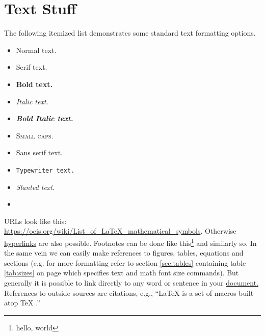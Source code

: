 \section{Text Stuff}
The following  itemized   list
demonstrates
    some standard 
%
text
%
%
    formatting options.

\begin{multicols}{2}
\begin{itemize}[itemsep=0mm]
	\item[\checkmark] Normal text.
	\item \textrm{Serif text.}
	\item \textbf{Bold text.} %
	\item \textit{Italic text.} %
	\item \textbf{\textit{Bold Italic text.}}
	\item \textsc{Small caps.}
	\item \textsf{Sans serif text.} %
	\item \texttt{Typewriter text.} %
	\item \textsl{Slanted text.}
	\item[\vspace{\fill}] %
\end{itemize}
\end{multicols}

URLs look like this: \url{https://oeis.org/wiki/List_of_LaTeX_mathematical_symbols}.
Otherwise \href{http://jwilson.coe.uga.edu/EMT668/EMAT6680.F99/Challen/proof/proof.html}{hyperlinks} are also possible.
Footnotes can be done like this\footnote{hello, world} and \reversemarginpar{} similarly so.
In the same vein we can easily make references to figures, tables, equations and sections (e.g. for more formatting refer to section \ref{sec:tables} containing table \ref{tab:sizes} on page \pageref{tab:sizes} which specifies text and math font size commands).
But generally it is possible to link directly to any word or sentence in your \hyperlink{thelink}{document.}
References to outside sources are citations, e.g., ``\LaTeX{} \cite{lamport94} is a set of macros built atop \TeX{} \cite{texbook}.''

